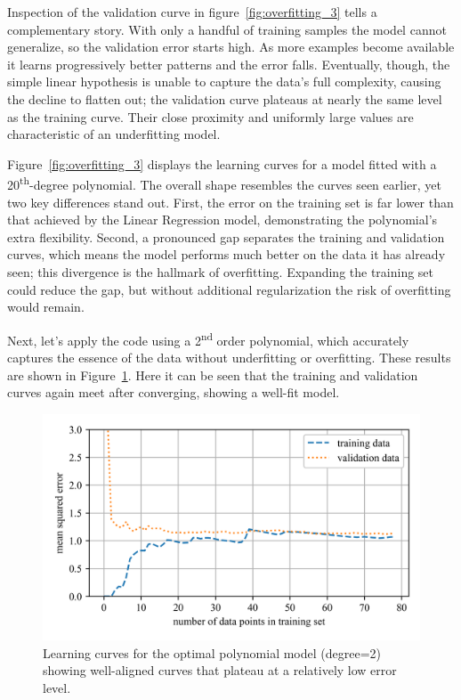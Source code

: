 \documentclass[12pt,letter]{article}
\begin{document}
Inspection of the validation curve in figure~\ref{fig:overfitting_3}  tells a complementary story. With only a handful of training samples the model cannot generalize, so the validation error starts high. As more examples become available it learns progressively better patterns and the error falls. Eventually, though, the simple linear hypothesis is unable to capture the data's full complexity, causing the decline to flatten out; the validation curve plateaus at nearly the same level as the training curve. Their close proximity and uniformly large values are characteristic of an underfitting model.


Figure~\ref{fig:overfitting_3} displays the learning curves for a model fitted with a 20\textsuperscript{th}-degree polynomial. The overall shape resembles the curves seen earlier, yet two key differences stand out. First, the error on the training set is far lower than that achieved by the Linear Regression model, demonstrating the polynomial's extra flexibility. Second, a pronounced gap separates the training and validation curves, which means the model performs much better on the data it has already seen; this divergence is the hallmark of overfitting. Expanding the training set could reduce the gap, but without additional regularization the risk of overfitting would remain.


Next, let's apply the code using a 2\textsuperscript{nd} order polynomial, which accurately captures the essence of the data without underfitting or overfitting. These results are shown in Figure~\ref{fig:overfitting_4}. Here it can be seen that the training and validation curves again meet after converging, showing a well-fit model.

\begin{figure}[H]
    \centering
    \includegraphics[]{../figures/overfitting_4.png}
    \caption{Learning curves for the optimal polynomial model (degree=2) showing well-aligned curves that plateau at a relatively low error level.}
    \label{fig:overfitting_4}
\end{figure}
\end{document}
